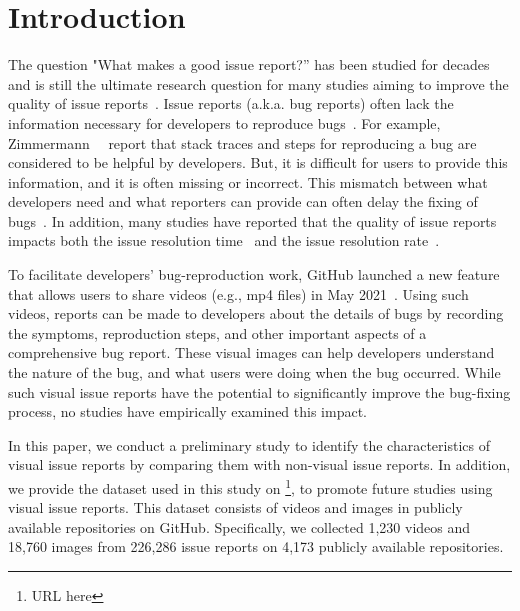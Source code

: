 \section{Introduction}
\label{sec:intro}
The question "What makes a good issue report?'' has been studied for decades and is still the ultimate research question for many studies aiming to improve the quality of issue reports~\citep{DBLP:conf/icse/HerzigJZ13}\citep{zimmermann2010TSE}\citep{DBLP:conf/eclipse/BettenburgJSWPZ07}. Issue reports (a.k.a. bug reports) often lack the information necessary for developers to reproduce bugs~\citep{DBLP:conf/msr/JoorabchiMM14}\citep{DearGitHub}. 
For example, Zimmermann~\et~\citep{zimmermann2010TSE} report that stack traces and steps for reproducing a bug are considered to be helpful by developers. But, it is difficult for users to provide this information, and it is often missing or incorrect. 
This mismatch between what developers need and what reporters can provide can often delay the fixing of bugs~\citep{DBLP:conf/msr/JoorabchiMM14}. In addition, many studies have reported that the quality of issue reports impacts both the issue resolution time~\citep{DBLP:conf/cscw/BreuPSZ10}\citep{DBLP:conf/icse/GuoZNM10} and the issue resolution rate~\citep{DBLP:conf/compsac/ZouXZCL15}\citep{DBLP:conf/icse/ZimmermannNGM12}. 

To facilitate developers' bug-reproduction work, GitHub launched a new feature that allows users to share videos (e.g., mp4 files) in May 2021~\citep{github-video-blog}. Using such videos, reports can be made to developers about the details of bugs by recording the symptoms, reproduction steps, and other important aspects of a comprehensive bug report. These visual images can help developers understand the nature of the bug, and what users were doing when the bug occurred. While such visual issue reports have the potential to significantly improve the bug-fixing process, no studies have empirically examined this impact. 

In this paper, we conduct a preliminary study to identify the characteristics of visual issue reports by comparing them with non-visual issue reports.  In addition, we provide the dataset used in this study on \footnote{URL here}, to promote future studies using visual issue reports. This dataset consists of videos and images in publicly available repositories on GitHub. Specifically, we collected 1,230 videos and 18,760 images from 226,286 issue reports on 4,173 publicly available repositories.


